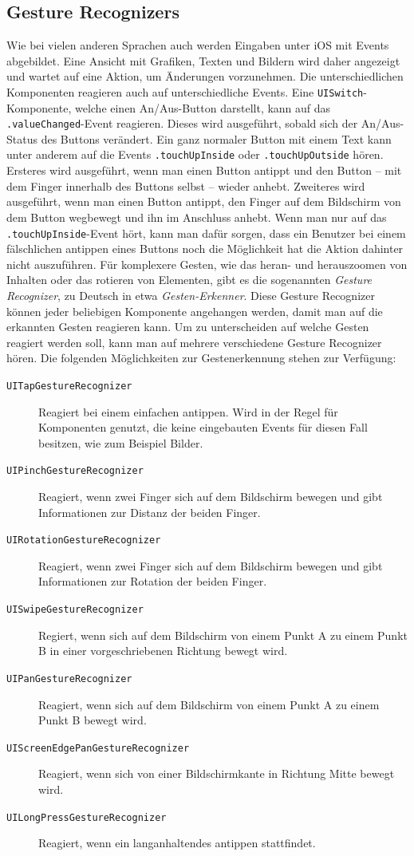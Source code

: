 \subsection{Gesture Recognizers}
\label{subsec:gesturerecognizer}
Wie bei vielen anderen Sprachen auch werden Eingaben unter iOS mit Events abgebildet.
Eine Ansicht mit Grafiken, Texten und Bildern wird daher angezeigt und wartet auf eine Aktion, um Änderungen vorzunehmen.
Die unterschiedlichen Komponenten reagieren auch auf unterschiedliche Events.
Eine \texttt{UISwitch}-Komponente, welche einen An/Aus-Button darstellt, kann auf das \texttt{.valueChanged}-Event reagieren.
Dieses wird ausgeführt, sobald sich der An/Aus-Status des Buttons verändert.
Ein ganz normaler Button mit einem Text kann unter anderem auf die Events \texttt{.touchUpInside} oder \texttt{.touchUpOutside} hören.
Ersteres wird ausgeführt, wenn man einen Button antippt und den Button – mit dem Finger innerhalb des Buttons selbst – wieder anhebt.
Zweiteres wird ausgeführt, wenn man einen Button antippt, den Finger auf dem Bildschirm von dem Button wegbewegt und ihn im Anschluss anhebt.
Wenn man nur auf das \texttt{.touchUpInside}-Event hört, kann man dafür sorgen, dass ein Benutzer bei einem fälschlichen antippen eines Buttons noch die Möglichkeit hat die Aktion dahinter nicht auszuführen.\pbreak%
%
Für komplexere Gesten, wie das heran- und herauszoomen von Inhalten oder das rotieren von Elementen, gibt es die sogenannten \emph{Gesture Recognizer}, zu Deutsch in etwa \emph{Gesten-Erkenner}.
Diese Gesture Recognizer können jeder beliebigen Komponente angehangen werden, damit man auf die erkannten Gesten reagieren kann.
Um zu unterscheiden auf welche Gesten reagiert werden soll, kann man auf mehrere verschiedene Gesture Recognizer hören.
Die folgenden Möglichkeiten zur Gestenerkennung stehen zur Verfügung:
\begin{description}
	\item[\texttt{UITapGestureRecognizer}] Reagiert bei einem einfachen antippen. Wird in der Regel für Komponenten genutzt, die keine eingebauten Events für diesen Fall besitzen, wie zum Beispiel Bilder.
	\item[\texttt{UIPinchGestureRecognizer}] Reagiert, wenn zwei Finger sich auf dem Bildschirm bewegen und gibt Informationen zur Distanz der beiden Finger.
	\item[\texttt{UIRotationGestureRecognizer}] Reagiert, wenn zwei Finger sich auf dem Bildschirm bewegen und gibt Informationen zur Rotation der beiden Finger.
	\item[\texttt{UISwipeGestureRecognizer}] Regiert, wenn sich auf dem Bildschirm von einem Punkt A zu einem Punkt B in einer vorgeschriebenen Richtung bewegt wird.
	\item[\texttt{UIPanGestureRecognizer}] Reagiert, wenn sich auf dem Bildschirm von einem Punkt A zu einem Punkt B bewegt wird.
	\item[\texttt{UIScreenEdgePanGestureRecognizer}] Reagiert, wenn sich von einer Bildschirmkante in Richtung Mitte bewegt wird.
	\item[\texttt{UILongPressGestureRecognizer}] Reagiert, wenn ein langanhaltendes antippen stattfindet.
\end{description}

